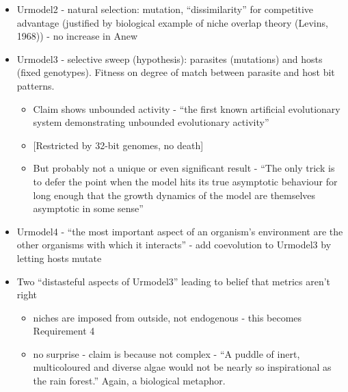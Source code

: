 \begin{itemize}
			\item
			
			Urmodel2 - natural selection: mutation, ``dissimilarity'' for
			competitive advantage (justified by biological example of niche
			overlap theory (Levins, 1968)) - no increase in Anew
			
			\item
			
			Urmodel3 - selective sweep (hypothesis): parasites (mutations) and
			hosts (fixed genotypes). Fitness on degree of match between parasite
			and host bit patterns.
			
			
			\begin{itemize}
				\item
				
				Claim shows unbounded activity - ``the first known artificial
				evolutionary system demonstrating unbounded evolutionary activity''
				
				\item
				
				{[}Restricted by 32-bit genomes, no death{]}
				
				\item
				
				But probably not a unique or even significant result - ``The only
				trick is to defer the point when the model hits its true asymptotic
				behaviour for long enough that the growth dynamics of the model are
				themselves asymptotic in some sense''
				
			\end{itemize}
			\item
			
			Urmodel4 - ``the most important aspect of an organism's environment
			are the other organisms with which it interacts'' - add coevolution to
			Urmodel3 by letting hosts mutate
			
			\item
			
			Two ``distasteful aspects of Urmodel3'' leading to belief that metrics
			aren't right
			
			
			\begin{itemize}
				\item
				
				niches are imposed from outside, not endogenous - this becomes
				Requirement 4
				
				\item
				
				no surprise - claim is because not complex - ``A puddle of inert,
				multicoloured and diverse algae would not be nearly so inspirational
				as the rain forest.'' Again, a biological metaphor.
				
			\end{itemize}
		\end{itemize}
		
